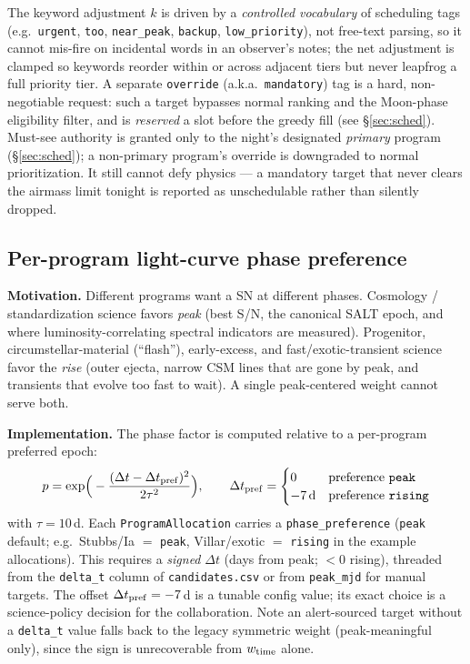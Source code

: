 \documentclass[11pt,letterpaper]{article}
\begin{document}
The keyword adjustment $k$ is driven by a \emph{controlled vocabulary} of scheduling tags
(e.g.\ \texttt{urgent}, \texttt{too}, \texttt{near\_peak}, \texttt{backup},
\texttt{low\_priority}), not free-text parsing, so it cannot mis-fire on incidental words in
an observer's notes; the net adjustment is clamped so keywords reorder within or across
adjacent tiers but never leapfrog a full priority tier. A separate \texttt{override} (a.k.a.\
\texttt{mandatory}) tag is a hard, non-negotiable request: such a target bypasses normal
ranking and the Moon-phase eligibility filter, and is \emph{reserved} a slot before the
greedy fill (see \S\ref{sec:sched}). Must-see authority is granted only to the night's
designated \emph{primary} program (\S\ref{sec:sched}); a non-primary program's override is
downgraded to normal prioritization. It still cannot defy physics --- a mandatory target that
never clears the airmass limit tonight is reported as unschedulable rather than silently
dropped.

\subsection{Per-program light-curve phase preference}\label{sec:phase}
\textbf{Motivation.} Different programs want a SN at different phases. Cosmology /
standardization science favors \emph{peak} (best S/N, the canonical SALT epoch, and where
luminosity-correlating spectral indicators are measured). Progenitor, circumstellar-material
(``flash''), early-excess, and fast/exotic-transient science favor the \emph{rise} (outer
ejecta, narrow CSM lines that are gone by peak, and transients that evolve too fast to wait).
A single peak-centered weight cannot serve both.

\textbf{Implementation.} The phase factor is computed relative to a per-program
preferred epoch:
\begin{equation}
p = \exp\!\Big(-\frac{(\Delta t - \Delta t_{\rm pref})^2}{2\tau^2}\Big),\qquad
\Delta t_{\rm pref} = \begin{cases} 0 & \text{preference } \texttt{peak} \\ -7\,\text{d} & \text{preference } \texttt{rising} \end{cases}
\end{equation}
with $\tau=10$\,d. Each \texttt{ProgramAllocation} carries a \texttt{phase\_preference}
(\texttt{peak} default; e.g.\ Stubbs/Ia $=$ \texttt{peak}, Villar/exotic $=$ \texttt{rising}
in the example allocations). This requires a \emph{signed} $\Delta t$ (days from peak;
$<0$ rising), threaded from the \texttt{delta\_t} column of \texttt{candidates.csv} or from
\texttt{peak\_mjd} for manual targets. The offset $\Delta t_{\rm pref} = -7$\,d is a tunable
config value; its exact choice is a science-policy decision for the collaboration. Note an
alert-sourced target without a \texttt{delta\_t} value falls back to the legacy symmetric
weight (peak-meaningful only), since the sign is unrecoverable from $w_{\rm time}$ alone.
\end{document}
